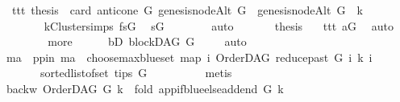 \begin{isabellebody}
\ \ ttt{\isacharcolon}{\kern0pt}\ {\isachardoublequoteopen}{\isacharquery}{\kern0pt}thesis\ {\isacharequal}{\kern0pt}\ {\isacharparenleft}{\kern0pt}card\ {\isacharparenleft}{\kern0pt}anticone\ G\ {\isacharparenleft}{\kern0pt}genesis{\isacharunderscore}{\kern0pt}nodeAlt\ G{\isacharparenright}{\kern0pt}\ {\isasyminter}\ {\isacharbraceleft}{\kern0pt}genesis{\isacharunderscore}{\kern0pt}nodeAlt\ G{\isacharbraceright}{\kern0pt}{\isacharparenright}{\kern0pt}\ {\isasymle}\ k{\isacharparenright}{\kern0pt}{\isachardoublequoteclose}\ \ \isanewline
\ \ \ \ \ \ \isamarkupfalse%
\ kCluster{\isachardot}{\kern0pt}simps\ fsG\ \isamarkupfalse%
\ sG\isanewline
\ \ \ \ \ \ \isamarkupfalse%
\ auto\ \isanewline
\ \ \ \ \isamarkupfalse%
\ {\isacharquery}{\kern0pt}thesis\ \isamarkupfalse%
\ \ ttt\ aG\ \isamarkupfalse%
\ auto\ \isanewline
\ \ \isamarkupfalse%
\isanewline
\ \ \ \ \isamarkupfalse%
\ more\isanewline
\ \ \ \ \isamarkupfalse%
\ bD{\isacharcolon}{\kern0pt}\ blockDAG\ G\ \isamarkupfalse%
\ {}{\isacharparenleft}{\kern0pt}{}{\isacharparenright}{\kern0pt}\ \isamarkupfalse%
\ auto\isanewline
\ \ \ \ \isamarkupfalse%
\ ma\ \ pp{\isacharunderscore}{\kern0pt}in{\isacharcolon}{\kern0pt}\ {\isachardoublequoteopen}ma\ {\isacharequal}{\kern0pt}\ {\isacharparenleft}{\kern0pt}choose{\isacharunderscore}{\kern0pt}max{\isacharunderscore}{\kern0pt}blue{\isacharunderscore}{\kern0pt}set\ {\isacharparenleft}{\kern0pt}map\ {\isacharparenleft}{\kern0pt}{\isasymlambda}i{\isachardot}{\kern0pt}\ {\isacharparenleft}{\kern0pt}OrderDAG\ {\isacharparenleft}{\kern0pt}reduce{\isacharunderscore}{\kern0pt}past\ G\ i{\isacharparenright}{\kern0pt}\ k{\isacharcomma}{\kern0pt}\ i{\isacharparenright}{\kern0pt}{\isacharparenright}{\kern0pt}\isanewline
\ \ \ \ \ \ \ {\isacharparenleft}{\kern0pt}sorted{\isacharunderscore}{\kern0pt}list{\isacharunderscore}{\kern0pt}of{\isacharunderscore}{\kern0pt}set\ {\isacharparenleft}{\kern0pt}tips\ G{\isacharparenright}{\kern0pt}{\isacharparenright}{\kern0pt}{\isacharparenright}{\kern0pt}{\isacharparenright}{\kern0pt}{\isachardoublequoteclose}\isanewline
\ \ \ \ \ \ \ \ \isamarkupfalse%
\ {\isacharparenleft}{\kern0pt}metis{\isacharparenright}{\kern0pt}\isanewline
\ \ \ \ \isamarkupfalse%
\ \isamarkupfalse%
\ backw{\isacharcolon}{\kern0pt}\ {\isachardoublequoteopen}OrderDAG\ G\ k\ {\isacharequal}{\kern0pt}\ fold\ {\isacharparenleft}{\kern0pt}app{\isacharunderscore}{\kern0pt}if{\isacharunderscore}{\kern0pt}blue{\isacharunderscore}{\kern0pt}else{\isacharunderscore}{\kern0pt}add{\isacharunderscore}{\kern0pt}end\ G\ k{\isacharparenright}{\kern0pt}\ \isanewline

\end{isabellebody}
